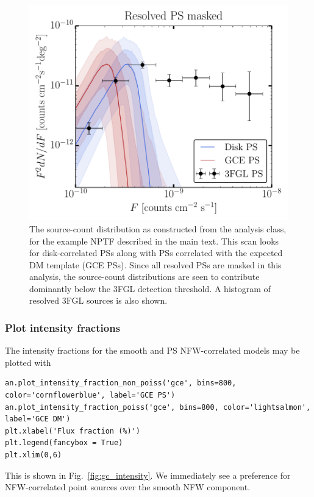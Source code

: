 \begin{figure}[htb]
\leavevmode
\begin{center}
\includegraphics[width=.8\textwidth]{ch-nptfit/dnds_masked.pdf}
\end{center}
\vspace{-.50cm}
\caption{The source-count distribution as constructed from the analysis class, for the example NPTF described in the main text.  This scan looks for  disk-correlated PSs along with PSs correlated with the expected DM template (GCE PSs).  Since all resolved PSs are masked in this analysis, the source-count distributions are seen to contribute dominantly below the 3FGL detection threshold.  A histogram of resolved 3FGL sources is also shown.}
\label{fig:gc_dndf}
\end{figure} 

\subsubsection{Plot intensity fractions}

The intensity fractions for the smooth and PS NFW-correlated models may be plotted with

\begin{lstlisting}
an.plot_intensity_fraction_non_poiss('gce', bins=800, color='cornflowerblue', label='GCE PS')
an.plot_intensity_fraction_poiss('gce', bins=800, color='lightsalmon', label='GCE DM')
plt.xlabel('Flux fraction (%)')
plt.legend(fancybox = True)
plt.xlim(0,6)
\end{lstlisting}

This is shown in Fig.~\ref{fig:gc_intensity}. We immediately see a preference for NFW-correlated point sources over the smooth NFW component.

